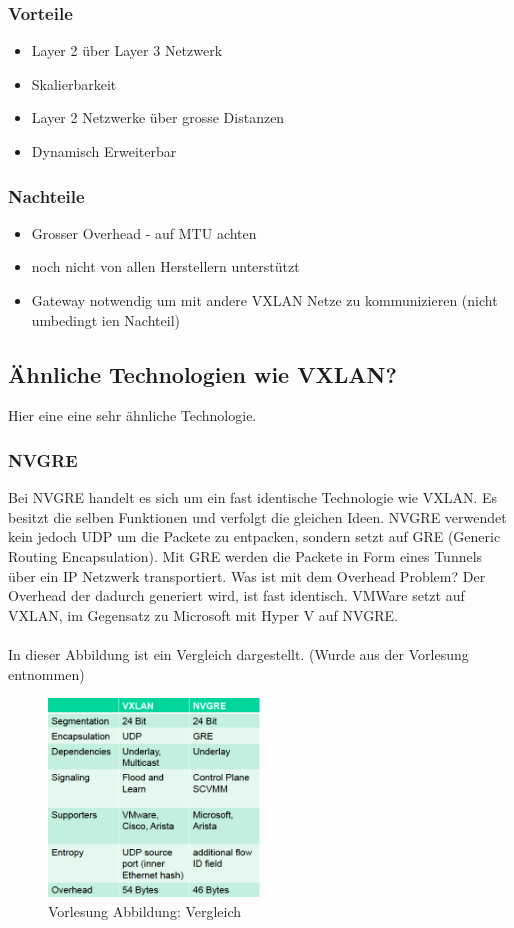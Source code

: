 \documentclass[a4,12pt]{scrartcl}
\begin{document}
\subsubsection{Vorteile}
\begin{itemize}
\item Layer 2 über Layer 3 Netzwerk 
\item Skalierbarkeit 
\item Layer 2 Netzwerke über grosse Distanzen
\item Dynamisch Erweiterbar 
\end{itemize}

\subsubsection{Nachteile}
\begin{itemize}
\item Grosser Overhead - auf MTU achten 
\item noch nicht von allen Herstellern unterstützt
\item Gateway notwendig um mit andere VXLAN Netze zu kommunizieren (nicht umbedingt ien Nachteil) 
\end{itemize}

\subsection{Ähnliche Technologien wie VXLAN?}
Hier eine eine sehr ähnliche Technologie. 
\subsubsection{NVGRE}
Bei NVGRE handelt es sich um ein fast identische Technologie wie VXLAN. Es besitzt die selben Funktionen und verfolgt die gleichen Ideen. NVGRE verwendet kein jedoch UDP um die Packete zu entpacken, sondern setzt auf GRE (Generic Routing Encapsulation). Mit GRE werden die Packete in Form eines Tunnels über ein IP Netzwerk transportiert. Was ist mit dem Overhead Problem? Der Overhead der dadurch generiert wird, ist fast identisch. VMWare setzt auf VXLAN, im Gegensatz zu Microsoft mit Hyper V auf NVGRE. \\
\\
In dieser Abbildung ist ein Vergleich dargestellt. (Wurde aus der Vorlesung entnommen) 
\begin{figure} [H]
	\begin{center}
	\includegraphics[width=0.50\textwidth]{./pictures/vergleich_vxlan-nvgre.png}
	\caption{Vorlesung Abbildung: Vergleich}
	\label{x}
	\end{center}
\end{figure}
\end{document}
